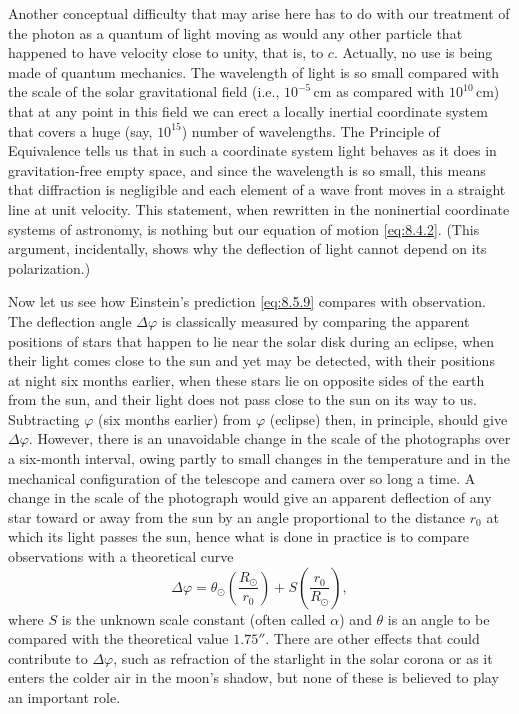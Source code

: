 Another conceptual difficulty that may arise here has to do with our
treatment of the photon as a quantum of light moving as would any other
particle that happened to have velocity close to unity, that is, to \(c\).
Actually, no use is being made of quantum mechanics. The wavelength of light
is so small compared with the scale of the solar gravitational field (i.e.,
\(10^{-5}\,\mathrm{cm}\) as compared with \(10^{10}\,\mathrm{cm}\)) that
at any point in this field we can erect a locally inertial coordinate system
that covers a huge (say, \(10^{15}\)) number of wavelengths. The Principle
of Equivalence tells us that in such a coordinate system light behaves as it
does in gravitation-free empty space, and since the wavelength is so small,
this means that diffraction is negligible and each element of a wave front
moves in a straight line at unit velocity. This statement, when rewritten
in the noninertial coordinate systems of astronomy, is nothing but our
equation of motion \eqref{eq:8.4.2}. (This argument, incidentally, shows why
the deflection of light cannot depend on its polarization.)

Now let us see how Einstein's prediction \eqref{eq:8.5.9} compares with
observation. The deflection angle \(\Delta\varphi\) is classically measured
by comparing the apparent positions of stars that happen to lie near the
solar disk during an eclipse, when their light comes close to the sun and
yet may be detected, with their positions at night six months earlier, when
these stars lie on opposite sides of the earth from the sun, and their light
does not pass close to the sun on its way to us. Subtracting \(\varphi\)
(six months earlier) from \(\varphi\) (eclipse) then, in principle, should
give \(\Delta\varphi\). However, there is an unavoidable change in the scale
of the photographs over a six-month interval, owing partly to small changes
in the temperature and in the mechanical configuration of the telescope and
camera over so long a time. A change in the scale of the photograph would
give an apparent deflection of any star toward or away from the sun by an
angle proportional to the distance \(r_0\) at which its light passes the
sun, hence what is done in practice is to compare observations with a
theoretical curve
\begin{equation}
  \Delta\varphi
  =
  \theta_\odot\left(\frac{R_\odot}{r_0}\right)
  +S\left(\frac{r_0}{R_\odot}\right),
  \tag{8.5.12}\label{eq:8.5.12}
\end{equation}
where \(S\) is the unknown scale constant (often called \(\alpha\)) and
\(\theta\) is an angle to be compared with the theoretical value
\(1.75''\). There are other effects that could contribute to
\(\Delta\varphi\), such as refraction of the starlight in the solar corona
or as it enters the colder air in the moon's shadow, but none of these is
believed to play an important role.

